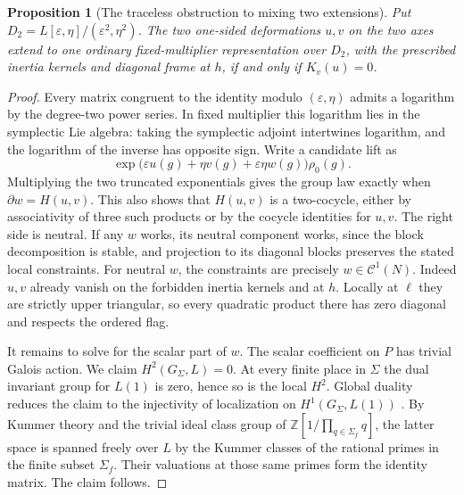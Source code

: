 \documentclass[a4paper,11pt]{article}
\newtheorem{proposition}{Proposition}[section]
\theoremstyle{definition}
\theoremstyle{remark}
\newcommand{\ZZ}{\mathbb Z}\newcommand{\ord}{\operatorname{ord}}
\numberwithin{equation}{section}
\begin{document}
\begin{proposition}[The traceless obstruction to mixing two extensions]
\leavevmode\label{prop:mixedobstruction569}
Put \(D_2=L[\varepsilon,\eta]/(\varepsilon^2,\eta^2)\).
The two one-sided deformations \(u,v\) on the two axes extend
to one ordinary fixed-multiplier representation over \(D_2\),
with the prescribed inertia kernels and diagonal frame at
\(h\), if and only if \(K_v(u)=0\).
\end{proposition}
\begin{proof}
Every matrix congruent to the identity modulo
\((\varepsilon,\eta)\) admits a logarithm by the degree-two
power series. In fixed multiplier this logarithm lies in the
symplectic Lie algebra: taking the symplectic adjoint
intertwines logarithm, and the logarithm of the inverse has
opposite sign. Write a candidate lift as
\[
    \exp\bigl(\varepsilon u(g)+\eta v(g)+
                        \varepsilon\eta w(g)\bigr)\rho_0(g).
\]
Multiplying the two truncated exponentials gives the group
law exactly when \(\partial w=H(u,v)\). This also shows that
\(H(u,v)\) is a two-cocycle, either by associativity of
three such products or by the cocycle identities for \(u,v\).
The right side is neutral. If any \(w\) works, its neutral
component works, since the block decomposition is stable,
and projection to its diagonal blocks preserves the stated
local constraints. For neutral \(w\), the constraints are
precisely \(w\in\mathcal C^1(N)\). Indeed \(u,v\) already
vanish on the forbidden inertia kernels and at \(h\).
Locally at \(\ell\) they are strictly upper triangular,
so every quadratic product there has zero diagonal and
respects the ordered flag.

It remains to solve for the scalar part of \(w\). The scalar
coefficient on \(P\) has trivial Galois action. We claim
\(H^2(G_\Sigma,L)=0\). At every finite place in \(\Sigma\)
the dual invariant group for \(L(1)\) is zero, hence so is
the local \(H^2\). Global duality reduces the claim to the
injectivity of localization on \(H^1(G_\Sigma,L(1))\)
\cite{XII-IX-V-milne98}. By Kummer theory and the trivial ideal
class group of \(\ZZ[1/\prod_{q\in\Sigma_f}q]\), the latter
space is spanned freely over \(L\) by the Kummer classes of
the rational primes in the finite subset \(\Sigma_f\).
Their valuations at those same primes form the identity
matrix. The claim follows.


\end{proof}
\end{document}
